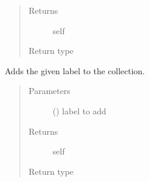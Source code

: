 \documentclass[letterpaper,10pt,english]{sphinxmanual}
\begin{document}
\begin{fulllineitems}
\begin{fulllineitems}
\begin{quote}
\begin{description}
\item[{Returns}] \leavevmode
self

\item[{Return type}] \leavevmode
{\hyperref[\detokenize{autoapi/pine/client/models/index:pine.client.models.CollectionBuilder}]{}}

\end{description}\end{quote}

\end{fulllineitems}


\begin{fulllineitems}
\label{\detokenize{autoapi/pine/client/index:pine.client.CollectionBuilder.label}}
Adds the given label to the collection.
\begin{quote}\begin{description}
\item[{Parameters}] \leavevmode
{} () \textendash{} label to add

\item[{Returns}] \leavevmode
self

\item[{Return type}] \leavevmode
{\hyperref[\detokenize{autoapi/pine/client/models/index:pine.client.models.CollectionBuilder}]{}}

\end{description}\end{quote}

\end{fulllineitems}



\end{fulllineitems}
\end{document}
